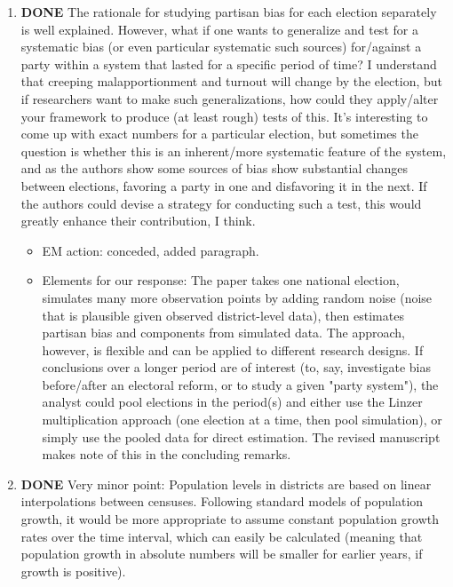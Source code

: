 \documentclass{article}
\begin{document}
\begin{enumerate}
\begin{itemize}
\end{itemize}
\item {\bfseries\sffamily DONE} The rationale for studying partisan bias for each election separately is well explained. However, what if one wants to generalize and test for a systematic bias (or even particular systematic such sources) for/against a party within a system that lasted for a specific period of time? I understand that creeping malapportionment and turnout will change by the election, but if researchers want to make such generalizations, how could they apply/alter your framework to produce (at least rough) tests of this. It's interesting to come up with exact numbers for a particular election, but sometimes the question is whether this is an inherent/more systematic feature of the system, and as the authors show some sources of bias show substantial changes between elections, favoring a party in one and disfavoring it in the next. If the authors could devise a strategy for conducting such a test, this would greatly enhance their contribution, I think.
\label{sec:orgheadline13}
\begin{itemize}
\item EM action: conceded, added paragraph.
\item Elements for our response: The paper takes one national election, simulates many more observation points by adding random noise (noise that is plausible given observed district-level data), then estimates partisan bias and components from simulated data. The approach, however, is flexible and can be applied to different research designs. If conclusions over a longer period are of interest (to, say, investigate bias before/after an electoral reform, or to study a given "party system"), the analyst could pool elections in the period(s) and either use the Linzer multiplication approach (one election at a time, then pool simulation), or simply use the pooled data for direct estimation. The revised manuscript makes note of this in the concluding remarks.
\end{itemize}
\item {\bfseries\sffamily DONE} Very minor point: Population levels in districts are based on linear interpolations between censuses. Following standard models of population growth, it would be more appropriate to assume constant population growth rates over the time interval, which can easily be calculated (meaning that population growth in absolute numbers will be smaller for earlier years, if growth is positive).
\label{sec:orgheadline14}
\begin{itemize}

\end{itemize}
\end{enumerate}
\end{document}
